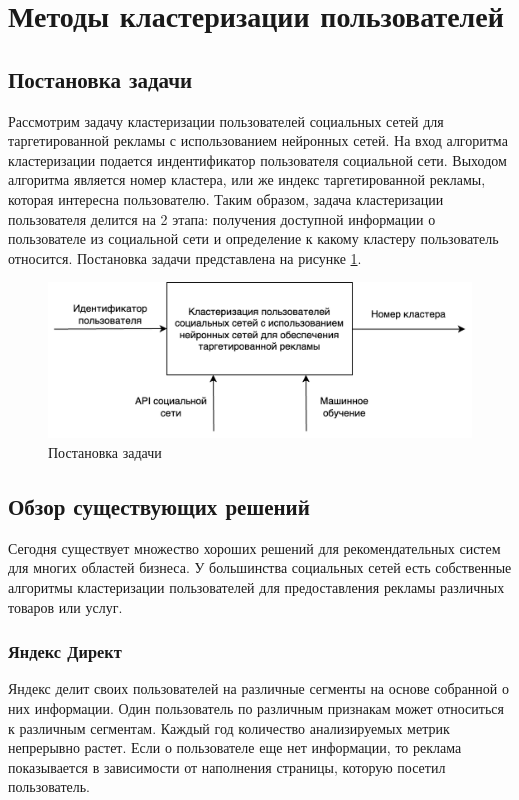 \section{Методы кластеризации пользователей}

\subsection{Постановка задачи}

Рассмотрим задачу кластеризации пользователей социальных сетей для таргетированной рекламы с использованием нейронных сетей. На вход алгоритма кластеризации подается индентификатор пользователя социальной сети. Выходом алгоритма является номер кластера, или же индекс таргетированной рекламы, которая интересна пользователю. Таким образом, задача кластеризации пользователя делится на 2 этапа: получения доступной информации о пользователе из социальной сети и определение к какому кластеру пользователь относится. Постановка задачи представлена на рисунке \ref{fig:a0_1}.

\begin{figure}[hbtp]
	\centering
	\includegraphics[scale=0.4]{img/a0_1.png}
	\caption{Постановка задачи}
	\label{fig:a0_1}
\end{figure}

\subsection{Обзор существующих решений}

Сегодня существует множество хороших решений для рекомендательных систем для многих областей бизнеса. У большинства социальных сетей есть собственные алгоритмы кластеризации пользователей для предоставления рекламы различных товаров или услуг. 

\subsubsection{Яндекс Директ}
Яндекс делит своих пользователей на различные сегменты на основе собранной о них информации. Один пользователь по различным признакам может относиться к различным сегментам. Каждый год количество анализируемых метрик непрерывно растет. Если о пользователе еще нет информации, то реклама показывается в зависимости от наполнения страницы, которую посетил пользователь.

